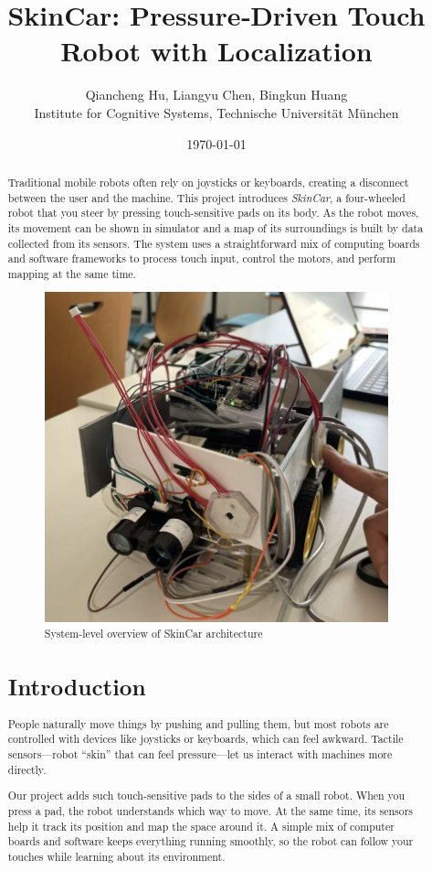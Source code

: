 \documentclass[12pt,a4paper]{article}
\title{SkinCar: Pressure‐Driven Touch Robot with Localization}
\author{Qiancheng Hu, Liangyu Chen, Bingkun Huang\\Institute for Cognitive Systems, Technische Universit\"{a}t M\"{u}nchen}
\date{\today}
\begin{document}
\maketitle

\begin{abstract}
Traditional mobile robots often rely on joysticks or keyboards, creating a disconnect between the user and the machine. This project introduces \emph{SkinCar}, a four-wheeled robot that you steer by pressing touch-sensitive pads on its body. As the robot moves, its movement can be shown in simulator and a map of its surroundings is built by data collected from its sensors. The system uses a straightforward mix of computing boards and software frameworks to process touch input, control the motors, and perform mapping at the same time. 

\begin{figure}[htbp] %
    \centering
    \includegraphics[width=0.5\linewidth]{car.png}
    \caption{System-level overview of SkinCar architecture}
    \label{fig:system-diagram}
\end{figure}
\section{Introduction}

People naturally move things by pushing and pulling them, but most robots are controlled with devices like joysticks or keyboards, which can feel awkward. Tactile sensors—robot “skin” that can feel pressure—let us interact with machines more directly.

Our project adds such touch-sensitive pads to the sides of a small robot. When you press a pad, the robot understands which way to move. At the same time, its sensors help it track its position and map the space around it. A simple mix of computer boards and software keeps everything running smoothly, so the robot can follow your touches while learning about its environment.


\end{abstract}
\end{document}
